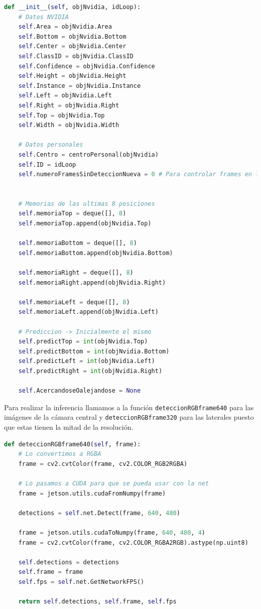 \begin{lstlisting}[float, language=python,caption=Constructor de la clase personal de vehículos,label={cod:constVeh}]
def __init__(self, objNvidia, idLoop):
    # Datos NVIDIA
    self.Area = objNvidia.Area
    self.Bottom = objNvidia.Bottom
    self.Center = objNvidia.Center
    self.ClassID = objNvidia.ClassID
    self.Confidence = objNvidia.Confidence
    self.Height = objNvidia.Height
    self.Instance = objNvidia.Instance
    self.Left = objNvidia.Left
    self.Right = objNvidia.Right
    self.Top = objNvidia.Top
    self.Width = objNvidia.Width

    # Datos personales
    self.Centro = centroPersonal(objNvidia)
    self.ID = idLoop
    self.numeroFramesSinDeteccionNueva = 0 # Para controlar frames en los que no se detecte


    # Memorias de las ultimas 8 posiciones
    self.memoriaTop = deque([], 8)
    self.memoriaTop.append(objNvidia.Top)

    self.memoriaBottom = deque([], 8)
    self.memoriaBottom.append(objNvidia.Bottom)

    self.memoriaRight = deque([], 8)
    self.memoriaRight.append(objNvidia.Right)

    self.memoriaLeft = deque([], 8)
    self.memoriaLeft.append(objNvidia.Left)

    # Prediccion -> Inicialmente el mismo 
    self.predictTop = int(objNvidia.Top)
    self.predictBottom = int(objNvidia.Bottom)
    self.predictLeft = int(objNvidia.Left)
    self.predictRight = int(objNvidia.Right)

    self.AcercandoseOalejandose = None
\end{lstlisting}


Para realizar la inferencia llamamos a la función \texttt{deteccionRGBframe640} para las imágenes de la cámara central y \texttt{deteccionRGBframe320} para las laterales puesto que estas tienen la mitad de la resolución.
\begin{lstlisting}[float, language=python,caption=Función encargada de realizar la inferencia con el modelo de detección de objetos, label={cod:inferObj}]
def deteccionRGBframe640(self, frame):
    # Lo convertimos a RGBA
    frame = cv2.cvtColor(frame, cv2.COLOR_RGB2RGBA)

    # Lo pasamos a CUDA para que se pueda usar con la net
    frame = jetson.utils.cudaFromNumpy(frame)

    detections = self.net.Detect(frame, 640, 480)

    frame = jetson.utils.cudaToNumpy(frame, 640, 480, 4)
    frame = cv2.cvtColor(frame, cv2.COLOR_RGBA2RGB).astype(np.uint8)

    self.detections = detections
    self.frame = frame
    self.fps = self.net.GetNetworkFPS()

    return self.detections, self.frame, self.fps
\end{lstlisting}
    




